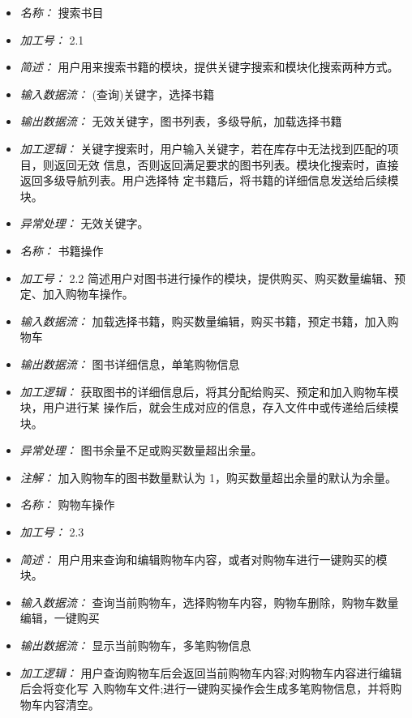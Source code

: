 \vspace{-1mm}


\begin{itemize}
\item \textit{名称： }搜索书目
\item \textit{加工号： }2.1
\item \textit{简述： }用户用来搜索书籍的模块，提供关键字搜索和模块化搜索两种方式。 
\item \textit{输入数据流： }(查询)关键字，选择书籍 
\item \textit{输出数据流： }无效关键字，图书列表，多级导航，加载选择书籍 
\item \textit{加工逻辑： }关键字搜索时，用户输入关键字，若在库存中无法找到匹配的项目，则返回无效 信息，否则返回满足要求的图书列表。模块化搜索时，直接返回多级导航列表。用户选择特 定书籍后，将书籍的详细信息发送给后续模块。
\item \textit{异常处理： }无效关键字。

\end{itemize}


\vspace{-1mm}


\begin{itemize}
\item \textit{名称： } 书籍操作
\item \textit{加工号： }2.2 简述用户对图书进行操作的模块，提供购买、购买数量编辑、预定、加入购物车操作。 
\item \textit{输入数据流： }加载选择书籍，购买数量编辑，购买书籍，预定书籍，加入购物车 
\item \textit{输出数据流： }图书详细信息，单笔购物信息 
\item \textit{加工逻辑： }获取图书的详细信息后，将其分配给购买、预定和加入购物车模块，用户进行某 操作后，就会生成对应的信息，存入文件中或传递给后续模块。 
\item \textit{异常处理： }图书余量不足或购买数量超出余量。
\item \textit{注解： }加入购物车的图书数量默认为 1，购买数量超出余量的默认为余量。

\end{itemize}


\vspace{-1mm}


\begin{itemize}
\item \textit{名称： } 购物车操作
\item \textit{加工号： }2.3 
\item \textit{简述： }用户用来查询和编辑购物车内容，或者对购物车进行一键购买的模块。 
\item \textit{输入数据流： }查询当前购物车，选择购物车内容，购物车删除，购物车数量编辑，一键购买 
\item \textit{输出数据流： }显示当前购物车，多笔购物信息 
\item \textit{加工逻辑： }用户查询购物车后会返回当前购物车内容;对购物车内容进行编辑后会将变化写 入购物车文件;进行一键购买操作会生成多笔购物信息，并将购物车内容清空。

\end{itemize}


